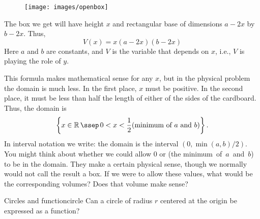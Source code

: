 \begin{solution} 
	
\begin{wrapfigure}{r}{0.4\textwidth}
	\begin{center}
		\texttt{[image: images/openbox]}
	\end{center}
	\caption{}
\end{wrapfigure}	
	
The box we get will have height $x$ and rectangular base of
dimensions $a-2x$ by $b-2x$.  Thus, 
$$V(x)=x(a-2x)(b-2x)$$
Here $a$ and $b$ are constants, and $V$ is the variable that depends
on $x$, i.e., $V$ is playing the role of $y$.  

This formula makes mathematical sense for any $x$, but in the physical
problem the domain is much less.  In the first place, $x$ must be
positive.  In the second place, it must be less than half the length
of either of the sides of the cardboard.  Thus, the domain is
$$\left\{x\in\mathbb{R}\,\ssep\,0<x<{\frac{1}{2}}(\hbox{minimum~of~$a$~and~$b$})\right\}.$$
In interval notation we write: the domain is the interval
$(0,\min(a,b)/2)$. You might think about whether we could allow 0 or 
(the minimum~of~$a$~and~$b$) to be in the domain. They make a certain
physical sense, though we normally would not call the result a box. If we
were to allow these values, what would be the corresponding volumes?
Does that volume make sense?



\end{solution}



\begin{example}{Circles and function}{circle}
	Can a circle of radius $r$ centered at the origin be expressed as a function? 
	
\end{example}

